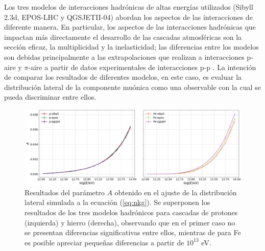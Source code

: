 \documentclass[12pt,letterpaper]{report}
\begin{document}
	Los tres modelos de interacciones hadr\'onicas de altas energ\'ias utilizados (Sibyll 2.3d, EPOS-LHC y QGSJETII-04) abordan los aspectos de las interacciones de diferente manera. En particular, los aspectos de las interacciones hadr\'onicas que impactan m\'as directamente el desarrollo de las cascadas atmosf\'ericas son la secci\'on eficaz, la multiplicidad y la inelasticidad; las diferencias entre los modelos son debidas principalmente a las extrapolaciones que realizan a interacciones p-aire y $\pi$-aire a partir de datos experimentales de interacciones p-p \cite{Pierog2018}. La intenci\'on de comparar los resultados de diferentes modelos, en este caso, es evaluar la distribuci\'on lateral de la componente mu\'onica como una observable con la cual se pueda discriminar entre ellos.\\
		\begin{figure} []
		\includegraphics[width=\textwidth]{Figuras/models_nkgA}
		\caption{Resultados del par\'ametro $A$ obtenido en el ajuste de la distribuci\'on lateral simulada a la ecuaci\'on (\ref{eq:nkg}). Se superponen los resultados de los tres modelos hadr\'onicos para cascadas de protones (izquierda) y hierro (derecha), observando que en el primer caso no se presentan diferencias significativas entre ellos, mientras de para Fe es posible apreciar peque\~{n}as diferencias a partir de $10^{13}$ eV.}
		\label{fig:models_nkgA}
		\end{figure}			
	
\end{document}
